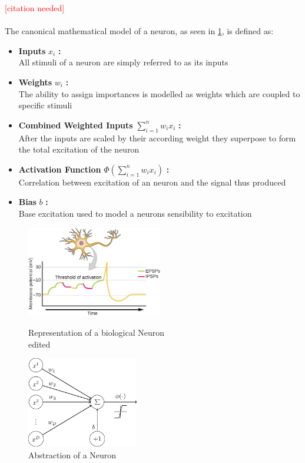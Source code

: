 \textcolor{red}{[citation needed]}\\
\\
The canonical mathematical model of a neuron, as seen in \ref{fig:neuron2}, is defined as:
\begin{itemize}
	\item \textbf{Inputs} $x_i$ \textbf{:}\\
	All stimuli of a neuron are simply referred to as its inputs\\
	\item \textbf{Weights} $w_i$ \textbf{:}\\
	The ability to assign importances is modelled as weights which are coupled to specific stimuli\\
	\item \textbf{Combined Weighted Inputs} $\sum_{i=1}^{n}w_i x_i$ \textbf{:}\\
	After the inputs are scaled by their according weight they superpose to form the total excitation of the neuron\\
	\item \textbf{Activation Function} $\Phi(\sum_{i=1}^{n}w_i x_i)$ \textbf{:}\\
	Correlation between excitation of an neuron and the signal thus produced\\
	\item \textbf{Bias} $b$ \textbf{:}\\  
	Base excitation used to model a neurons sensibility to excitation\\
\end{itemize}

\begin{figure}
	\centering
	\begin{minipage}{0.45\textwidth}
		\centering
		\includegraphics[height=150px]{gfx/Biological_Neuron_edited.jpg}
		\caption{Representation of a biological Neuron\\
			\cite{biology} edited}
		\label{fig:neuron1}
	\end{minipage}\hfill
	\begin{minipage}{0.45\textwidth}
		\centering
		\includegraphics[height=150px]{gfx/Abstract_Neuron.png}
		\caption{Abstraction of a Neuron\\
			\cite{abstract_neuron}}
		\label{fig:neuron2}
	\end{minipage}
\end{figure}

